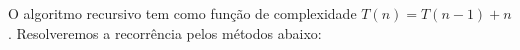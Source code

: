O algoritmo recursivo tem como função de complexidade $T(n) = T(n - 1) + n$. Resolveremos a recorrência pelos métodos abaixo:



